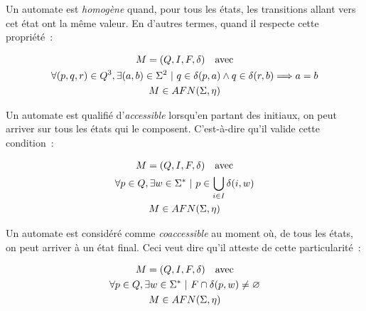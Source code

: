 \begin{definition}
    Un automate est \textit{homogène} quand, pour tous les états, les
    transitions allant vers cet état ont la même valeur. En d'autres termes,
    quand il respecte cette propriété~:

    \begin{gather*}
        M = (Q, I, F, \delta) \quad \text{avec} \\
        \forall (p, q, r) \in Q^3, \exists (a, b) \in \Sigma^2 ~|~ q \in \delta(p, a) \land q \in \delta(r, b) \Longrightarrow a = b \notag \\
        M \in AFN(\Sigma, \eta) \notag
    \end{gather*}
\end{definition}

\begin{definition}
    Un automate est qualifié d'\textit{accessible} lorsqu'en partant des
    initiaux, on peut arriver sur tous les états qui le composent. C'est-à-dire
    qu'il valide cette condition~:

    \begin{gather*}
        M = (Q, I, F, \delta) \quad \text{avec} \\
        \forall p \in Q, \exists w \in \Sigma^* ~|~ p \in \bigcup_{i \in I} \delta(i, w) \notag \\
        M \in AFN(\Sigma, \eta) \notag
    \end{gather*}
\end{definition}

\begin{definition}
    Un automate est considéré comme \textit{coaccessible} au moment où, de tous
    les états, on peut arriver à un état final. Ceci veut dire qu'il atteste de
    cette particularité~:

    \begin{gather*}
        M = (Q, I, F, \delta) \quad \text{avec} \\
        \forall p \in Q, \exists w \in \Sigma^* ~|~ F \cap \delta(p, w) \neq \varnothing \notag \\
        M \in AFN(\Sigma, \eta) \notag
    \end{gather*}
\end{definition}

